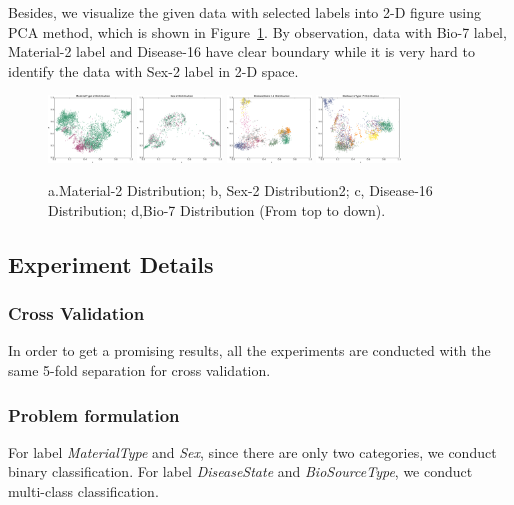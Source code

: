 \documentclass[sigconf]{acmart}
\begin{document}
	
	Besides, we visualize the given data with selected labels into 2-D figure using PCA method, which is shown in Figure~\ref{distribution_1}. By observation, data with Bio-7 label, Material-2 label and Disease-16 have clear boundary while it is very hard to identify the data with Sex-2 label in 2-D space.

	\begin{figure}[]
		\centering
		\includegraphics[width=0.2\textwidth]{../figs/Material-2.pdf}
		\includegraphics[width=0.2\textwidth]{../figs/Sex-2.pdf}
		\includegraphics[width=0.2\textwidth]{../figs/Disease-16.pdf}
		\includegraphics[width=0.2\textwidth]{../figs/Bio-7.pdf}
		\caption{a.Material-2 Distribution;  b, Sex-2 Distribution2; c, Disease-16 Distribution; d,Bio-7 Distribution (From top to down). }
		\label{distribution_1}
		\centering
	\end{figure}
	
	\subsection{Experiment Details}
	\subsubsection{Cross Validation}
	In order to get a promising results, all the experiments are conducted with the same 5-fold separation for cross validation.  
	
	\subsubsection{Problem formulation}
	For label \textit{MaterialType} and \textit{Sex}, since there are only two categories, we conduct binary classification. For label \textit{DiseaseState} and \textit{BioSourceType}, we conduct multi-class classification.
	
\end{document}
